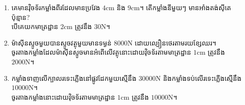 \begin{exercise}
	\begin{enumerate}
		\item គេមានវ៉ិចទ័រកម្លាំងពីរដែលមានប្រវែង $4\si{\centi\metre}$ និង $9\si{\centi\metre}$។ តើកម្លាំងនីមួយៗ មានអាំងតង់ស៊ីតេប៉ុន្មាន?\\ បើគេយកមាត្រដ្ឋាន $2\si{\centi\metre}$ ត្រូវនឹង $30\si{\newton}$។
		\item ម៉ាស៊ីនស្ទូចមួយបានស្ទូចវត្ថុមួយមានទម្ងន់ $8000\si{\newton}$ ដោយល្បឿនថេរតាមរយខ្សែឈរ។\\ ចូរតាងកម្លាំងដែលម៉ាស៊ីនស្ទូចមានអំពើលើវត្ថុនោះដោយវ៉ិចទ័រតាមមាត្រដ្ឋាន $1\si{\centi\metre}$ ត្រូវនឹង $2000\si{\newton}$។
		\item កម្លាំងទាញលើក្បាលរទេះភ្លើងនៅផ្លូវដែកមួយស្មើនឹង $30000\si{\newton}$ និងកម្លាំងទប់លើរទេះភ្លើងស្មើនឹង $10000\si{\newton}$។\\ ចូរតាងកម្លាំងនោះដោយវ៉ិចទ័រតាមមាត្រដ្ឋាន $1\si{\centi\metre}$ ត្រូវនឹង $10000\si{\newton}$។
	\end{enumerate}
\end{exercise}
